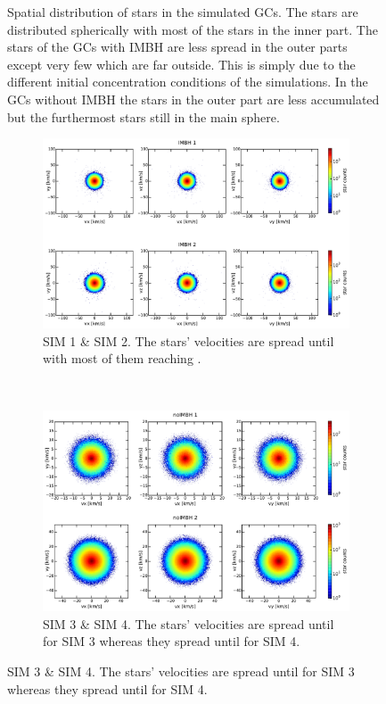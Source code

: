 \begin{figure}[htbp]
\caption{Spatial distribution of stars in the simulated \acp{GC}. The stars are distributed spherically with most of the stars in the inner part. The stars of the \acp{GC} with \ac{IMBH} are less spread in the outer parts except very few which are far outside. This is simply due to the different initial concentration conditions of the simulations. In the \acp{GC} without \ac{IMBH} the stars in the outer part are less accumulated but the furthermost stars still in the main sphere.}
\label{fig:position_scatter}
\end{figure}

\begin{figure}[htbp] 
\centering
	\begin{subfigure}{0.9\textwidth}
		\centering
	  	\includegraphics[width=\textwidth]{Plots/velocity_scatter_IMBH.pdf}
	  	\caption{SIM 1 \& SIM 2. The stars' velocities are spread until  with most of them reaching .}
	 	\label{fig:vel_scat_IMBH}
	\end{subfigure}
	\\
	\begin{subfigure}{0.9\textwidth}
		\centering
	  	\includegraphics[width=\textwidth]{Plots/velocity_scatter_noIMBH.pdf}
	  	\caption{SIM 3 \& SIM 4. The stars' velocities are spread until  for SIM 3 whereas they spread until  for SIM 4.}
	 	\label{fig:vel_scat_noIMBH}
	\end{subfigure}


\end{figure}
